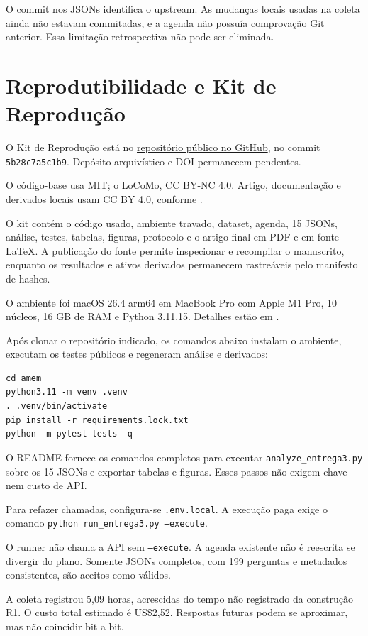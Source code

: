 \documentclass[sigconf]{acmart}
\begin{document}
O commit nos JSONs identifica o upstream. As mudanças locais usadas na coleta ainda não estavam commitadas, e a agenda não possuía comprovação Git anterior. Essa limitação retrospectiva não pode ser eliminada.

\section{Reprodutibilidade e Kit de Reprodução}

O Kit de Reprodução está no
\href{https://github.com/patrickdeangelis/amem-locomo-replication}{repositório público no GitHub},
no commit \texttt{5b28c7a5c1b9}. Depósito arquivístico e DOI permanecem pendentes.

O código-base usa MIT; o LoCoMo, CC BY-NC 4.0. Artigo, documentação e derivados locais usam CC BY 4.0, conforme .

O kit contém o código usado, ambiente travado, dataset, agenda, 15 JSONs, análise, testes, tabelas, figuras, protocolo e o artigo final em PDF e em fonte \LaTeX. A publicação do fonte permite inspecionar e recompilar o manuscrito, enquanto os resultados e ativos derivados permanecem rastreáveis pelo manifesto de hashes.

O ambiente foi macOS 26.4 arm64 em MacBook Pro com Apple M1 Pro, 10 núcleos, 16 GB de RAM e Python 3.11.15. Detalhes estão em .

Após clonar o repositório indicado, os comandos abaixo instalam o ambiente, executam os testes públicos e regeneram análise e derivados:

\begin{verbatim}
cd amem
python3.11 -m venv .venv
. .venv/bin/activate
pip install -r requirements.lock.txt
python -m pytest tests -q
\end{verbatim}

O README fornece os comandos completos para executar \texttt{analyze\_entrega3.py} sobre os 15 JSONs e exportar tabelas e figuras. Esses passos não exigem chave nem custo de API.

Para refazer chamadas, configura-se \texttt{.env.local}. A execução paga exige o comando \texttt{python run\_entrega3.py --execute}.

O runner não chama a API sem \texttt{--execute}. A agenda existente não é reescrita se divergir do plano. Somente JSONs completos, com 199 perguntas e metadados consistentes, são aceitos como válidos.

A coleta registrou 5,09 horas, acrescidas do tempo não registrado da construção R1. O custo total estimado é US\$2,52. Respostas futuras podem se aproximar, mas não coincidir bit a bit.
\end{document}
